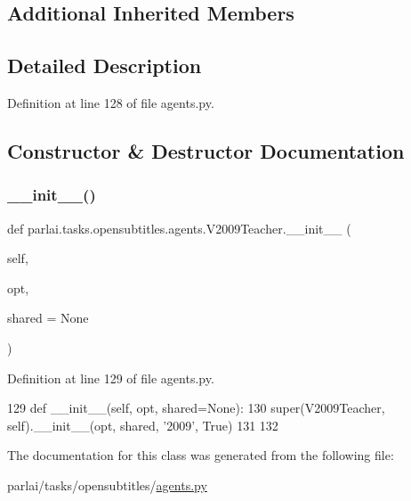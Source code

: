 \subsection*{Additional Inherited Members}


\subsection{Detailed Description}


Definition at line 128 of file agents.\+py.



\subsection{Constructor \& Destructor Documentation}
\mbox{\label{classparlai_1_1tasks_1_1opensubtitles_1_1agents_1_1V2009Teacher_ad42d78a9d6ecfb02d6807452e3648fbe}} 
\subsubsection{\texorpdfstring{\+\_\+\+\_\+init\+\_\+\+\_\+()}{\_\_init\_\_()}}
{\footnotesize\ttfamily def parlai.\+tasks.\+opensubtitles.\+agents.\+V2009\+Teacher.\+\_\+\+\_\+init\+\_\+\+\_\+ (\begin{DoxyParamCaption}\item[{}]{self,  }\item[{}]{opt,  }\item[{}]{shared = {\ttfamily None} }\end{DoxyParamCaption})}



Definition at line 129 of file agents.\+py.


\begin{DoxyCode}
129     \textcolor{keyword}{def }\_\_init\_\_(self, opt, shared=None):
130         super(V2009Teacher, self).\_\_init\_\_(opt, shared, \textcolor{stringliteral}{'2009'}, \textcolor{keyword}{True})
131 
132 
\end{DoxyCode}


The documentation for this class was generated from the following file\+:\begin{DoxyCompactItemize}
\item 
parlai/tasks/opensubtitles/\hyperlink{parlai_2tasks_2opensubtitles_2agents_8py}{agents.\+py}\end{DoxyCompactItemize}
